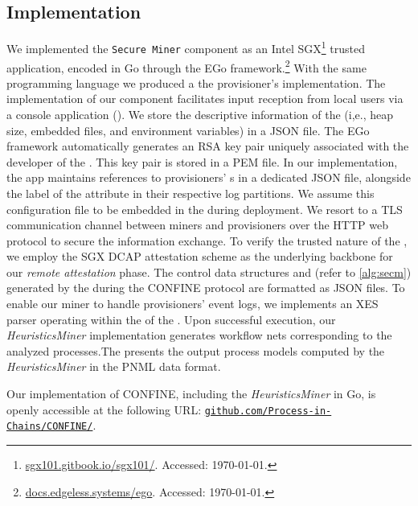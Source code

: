 \subsection{Implementation}
\label{sec:implementation:details}
\begin{newj}
We implemented the \texttt{Secure Miner} component as an Intel SGX\footnote{\url{sgx101.gitbook.io/sgx101/}. Accessed: \today.} trusted application, encoded in Go through the EGo framework.\footnote{\url{docs.edgeless.systems/ego}. Accessed: \today.} With the same programming language we produced a the provisioner's  implementation. 
The implementation of our  component facilitates input reception from local users via a console application (). We store the descriptive information of the  (i,e., heap size, embedded files, and environment variables) in a JSON file. The EGo framework automatically generates an RSA key pair uniquely associated with the developer of the . This key pair is stored in a PEM file. In our implementation, the  app maintains references to provisioners' s in a dedicated JSON file, alongside the label of the {\CId} attribute in their respective log partitions. We assume this configuration file to be embedded in the  during deployment. We resort to a TLS~\citep{Thomas/2000:SSL-TLS} communication channel between miners and provisioners over the HTTP web protocol to secure the information exchange. To verify the trusted nature of the , we employ the SGX DCAP attestation scheme as the underlying backbone for our \emph{remote attestation} phase. The control data structures {\CIDMap} and {\LPrvMap} (refer to \cref{alg:secm}) generated by the  during the CONFINE protocol are formatted as JSON files. To enable our miner  to handle provisioners' event logs, we implements an XES parser operating within the  of the . Upon successful execution, our \textit{HeuristicsMiner} implementation generates workflow nets corresponding to the analyzed processes.The  presents the output process models computed by the \textit{HeuristicsMiner} in the PNML data format. 

Our implementation of CONFINE, including the \textit{HeuristicsMiner} in Go, is openly accessible at the following URL: \href{https://github.com/Process-in-Chains/CONFINE/}{\nolinkurl{github.com/Process-in-Chains/CONFINE/}}.    



\end{newj}
